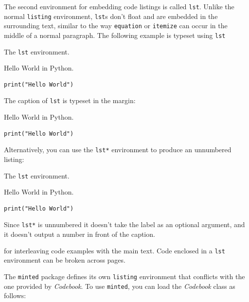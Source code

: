 \documentclass[minted]{codebook}
\begin{document}
The second environment for embedding code listings is called \verb|lst|.
Unlike the normal \verb|listing| environment, \verb|lst|s don't float and are embedded in the surrounding text, similar to the way \verb|equation| or \verb|itemize| can occur in the middle of a normal paragraph.
The following example is typeset using \verb|lst| 
\begin{lst*}{The \texttt{lst} environment.}
\begin{texcode}
\begin{lst}{Hello World in Python.}
\begin{Verbatim}
print("Hello World")
\end{Verbatim}
\end{lst}
\end{texcode}
\end{lst*}
The caption of \verb|lst| is typeset in the margin:
\begin{lst}{Hello World in Python.}
\begin{Verbatim}
print("Hello World")
\end{Verbatim}
\end{lst}

Alternatively, you can use the \verb|lst*| environment to produce an unnumbered listing:
\begin{lst*}{The \texttt{lst} environment.}
\begin{texcode}
\begin{lst*}{Hello World in Python.}
\begin{Verbatim}
print("Hello World")
\end{Verbatim}
\end{lst*}
\end{texcode}
\end{lst*}
Since \verb|lst*| is unnumbered it doesn't take the label as an optional argument, and it doesn't output a number in front of the caption.


for interleaving code examples with the main text.
Code enclosed in a \verb|lst| environment can be broken across pages.


\begin{note}
The \texttt{minted} package defines its own \verb|listing| environment that conflicts with the one provided by \emph{Codebook}.
To use \texttt{minted}, you can load the \emph{Codebook} class as follows:
\end{note}
\end{document}
